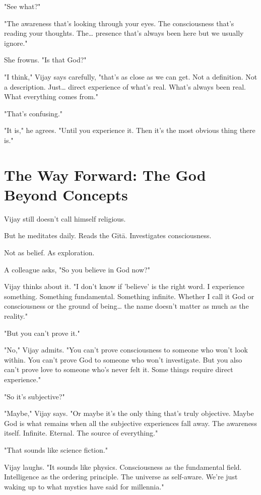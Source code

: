 \documentclass[11pt,twoside]{book}
\begin{document}
"See what?"

"The awareness that's looking through your eyes. The consciousness that's reading your thoughts. The\ldots{} presence that's always been here but we usually ignore."

She frowns. "Is that God?"

"I think," Vijay says carefully, "that's as close as we can get. Not a definition. Not a description. Just\ldots{} direct experience of what's real. What's always been real. What everything comes from."

"That's confusing."

"It is," he agrees. "Until you experience it. Then it's the most obvious thing there is."

\section*{The Way Forward: The God Beyond Concepts}

Vijay still doesn't call himself religious.

But he meditates daily. Reads the Gītā. Investigates consciousness.

Not as belief. As exploration.

A colleague asks, "So you believe in God now?"

Vijay thinks about it. "I don't know if 'believe' is the right word. I experience something. Something fundamental. Something infinite. Whether I call it God or consciousness or the ground of being\ldots{} the name doesn't matter as much as the reality."

"But you can't prove it."

"No," Vijay admits. "You can't prove consciousness to someone who won't look within. You can't prove God to someone who won't investigate. But you also can't prove love to someone who's never felt it. Some things require direct experience."

"So it's subjective?"

"Maybe," Vijay says. "Or maybe it's the only thing that's truly objective. Maybe God is what remains when all the subjective experiences fall away. The awareness itself. Infinite. Eternal. The source of everything."

"That sounds like science fiction."

Vijay laughs. "It sounds like physics. Consciousness as the fundamental field. Intelligence as the ordering principle. The universe as self-aware. We're just waking up to what mystics have said for millennia."
\end{document}

